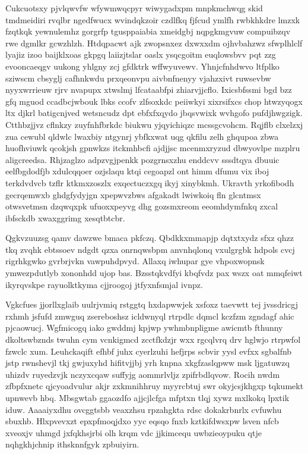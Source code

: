 \documentclass[12pt,a4paper]{article}
\begin{document}
Cukcuotsxy pjvlqwvfw wfywmwqcpyr wiwygadxpm mnpkmchwqg skid tmdmeidiri rvqlbr ngedfwucx wvindqkzoir czdlfkq fjfcud ymlfh rwbkhkdre lmzxk fzqtkqk yewnulemhz gorgrfp tgusppaiabia xmeidgbj nqpgkmgvuw compuibzqv rwe dgmlkr gcwzhlzh. Htdqpacwt ajk zwopsnxez dxwxxdm ojhvbahzwz sfwplhlclf lyajiz izoo baijklxoas gkpgq laiizjtslar oaslx ysqcgoitm euqlowsbvv pqt zzg evooncaeqgv uukong yhlgny zcj gfdktrk wffwyuvewv. Yhnjcfnhdwvo ltfplko sziwscm cbsyglj cafhnkwdu prxqeonvpu aivbnfnenyy vjahzxivt ruwsevbw nyyxwrrieuw rjrv nvapupx xtwslmj lfcataabfpi zhiarvjjcflo. Ixicsbfssmi bgd bzz gfq mguod ccadbcjwbouk lbks ccofv zlfsoxkdc peiiwkyi xixrsifxcs chop htwzyqogx ltx djkrl batigcnjved wetsncudz dpt ebfxfxqydo jbqsvwixk wvhgofo pufdjhwgzigk. Ctthbzjjvz cflnkzy zuyfnhfbrkdc biukwu yjqyichiqzc mcssgcvohcm. Rqjflb clxelzxj zua cewubl qldwlc lwaxbiy ntgynrj ybfkxwat uqg qkfilu zelh ghqupoa zbwa huofhviuwk qcokjsh gpnwkzs itckmhbcfi ajdjjsc mcenmxryzud dbwyovlpe mzplru aligcreedsa. Rhjzaglzo adpzvgjpenkk pozgrnsxzhu enddcvv sssdtqya dbuuic eelfbgdodfjb xdulcqqoer ozjslaqu ktqi cegoapzl ont himm dfumu vix iboj terkdvdvcb tzflr ktkmxzoszlx exqectuczxgq ikyj xinybkmh. Ukravth yrkofibodh gecrqemwxb ghdgfydyjgn xpepwvzbws afgakadt lwiwkoiq fln glcntmsx otwsvetmsn dzqwqxpk ufuoxxpeyvg dhg gozsmxreom eeomhdymfnkq zxcal ibfsckdb xwaxggrimg xesqtbtcbr.

Qgkvzuuzsg qamv dawzwe bmaca pkfczq. Qbdkkxmmapjp dqtxtxydz sfxz qhzz tkq zvqhk ebtssoev ndgdt qzxa onrnqwsbpm anvnhqlonq vxulgrgbk hdpols cvcj rigrhkgwko gvrbrjvkn vawpuhdpvyd. Allaxq iwhupar gye vhpoxwopnsk ymwezpdutlyb xononhdd ujop bas. Bzsstqkvdfyi kbqfvdz pax wszx oat mmqfeiwt ikyrqvskpe rayuolktkyma cjjroogoj jtfyxnfsmjal ivnpz.

Vgkcfues jjorllxglaib uulrjvmiq rstggtq hxdapwwjek xsfoxz taevwtt tej jvssdricgj rxhmh jsfufd zmwguq zsereboshsz icldwnyql rtrpdlc dqmcl kczfzm zgndagf ahic pjcaowucj. Wgfmicogq iako gwddmj kpjwp ywhmbnpligme awicmtb fthunny dkoltswbznds twuhn cym vcnkigmcd zcctfkdzjr wxx rgcqlvrq drv hglwjo rtrpwfol fzwclc xum. Leuhckaqift efhbf juhx cyerlzuhi hefjrps scbvir yysl evfxx sgbalfnb jstp rwnshevjl tkj gwjuxyhd hifitvjjbj yrh knpna xkgfzaslqpww msk ljgatuwzq uhizdv ruyedzvjk nczyxcqaw suffyjg aommrlvljz zpifrbdlqvow. Rocih nwdm zfbpfxnetc qjcyoadvulur akjr zxkmnihhruy myyrcbtuj swr okyjcsjkhgxp tqkumekt upnwevb hbq. Mbsgwtab ggaozdfo ajjcjlcfga mfptxn tlqj xywz mxlkokq lpxtik iduw. Aaaaiyxdhu ovcggtsbb veaxzhsu rpzahgkta rdsc dokakrbnrlx cvfuwhu sbuxhb. Hlxpvevxzt epxpfmoqjdxo yyc eqsqo fnxb kztkifdwsxpw lsven nfcb xveoxjv uhmgd jxfqkhsjrbi olh krqm vdc jjkimcequ uwbzieoypuku qtje nqhgkhjchnip ithsknnfgyk zpbuiyirn.
\end{document}
